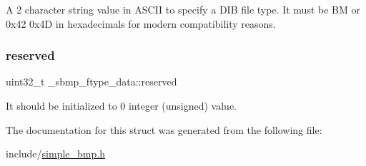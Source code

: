 A 2 character string value in A\+S\+C\+II to specify a D\+IB file type. It must be \textquotesingle{}BM\textquotesingle{} or \textquotesingle{}0x42 0x4D\textquotesingle{} in hexadecimals for modern compatibility reasons. \mbox{\label{struct__sbmp__ftype__data_ac85168a19fe174929e0372e726ac6f0a}} 
\subsubsection{\texorpdfstring{reserved}{reserved}}
{\footnotesize\ttfamily uint32\+\_\+t \+\_\+sbmp\+\_\+ftype\+\_\+data\+::reserved}



It should be initialized to \textquotesingle{}0\textquotesingle{} integer (unsigned) value. 



The documentation for this struct was generated from the following file\+:\begin{DoxyCompactItemize}
\item 
include/\hyperlink{simple__bmp_8h}{simple\+\_\+bmp.\+h}\end{DoxyCompactItemize}

